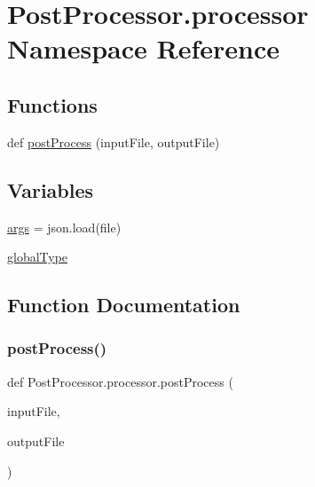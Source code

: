 \hypertarget{namespacePostProcessor_1_1processor}{}\section{Post\+Processor.\+processor Namespace Reference}
\label{namespacePostProcessor_1_1processor}
\subsection*{Functions}
\begin{DoxyCompactItemize}
\item 
def \hyperlink{namespacePostProcessor_1_1processor_a3f18e4947e2313a8b23367f06f4b02c2}{post\+Process} (input\+File, output\+File)
\end{DoxyCompactItemize}
\subsection*{Variables}
\begin{DoxyCompactItemize}
\item 
\hyperlink{namespacePostProcessor_1_1processor_a8187411843a6284ffb964ef3fb9fcab3}{args} = json.\+load(file)
\item 
\hyperlink{namespacePostProcessor_1_1processor_a7e91ec681fdd5ff588de2f2d2c3dc3f6}{global\+Type}
\end{DoxyCompactItemize}


\subsection{Function Documentation}
\mbox{\label{namespacePostProcessor_1_1processor_a3f18e4947e2313a8b23367f06f4b02c2}} 
\subsubsection{\texorpdfstring{post\+Process()}{postProcess()}}
{\footnotesize\ttfamily def Post\+Processor.\+processor.\+post\+Process (\begin{DoxyParamCaption}\item[{}]{input\+File,  }\item[{}]{output\+File }\end{DoxyParamCaption})}

